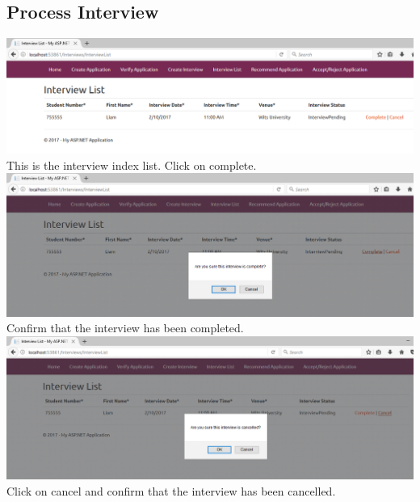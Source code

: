 \documentclass{article}
\begin{document}
\subsection{Process Interview}
\begin{center}
\includegraphics[scale=0.5]{ProcessInterview.png}\\
This is the interview index list. Click on complete.\\ \bigskip
\includegraphics[scale=0.5]{ProcessInterviewComplete.png}\\
Confirm that the interview has been completed.\\ \bigskip
\includegraphics[scale=0.5]{ProcessInterviewCancelled.png}\\
Click on cancel and confirm that the interview has been cancelled.\\ \bigskip
\end{center}
\end{document}

